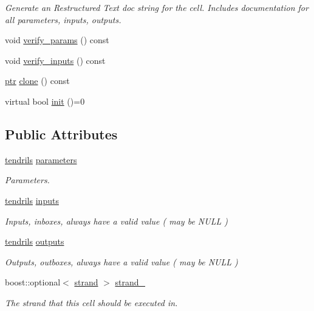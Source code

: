 \begin{DoxyCompactItemize}
\begin{DoxyCompactList}\small\item\em Generate an Restructured Text doc string for the cell. Includes documentation for all parameters, inputs, outputs. \end{DoxyCompactList}\item 
void \hyperlink{structecto_1_1cell_aa03c0f569bb4b14e81f4d2a8747273e5}{verify\-\_\-params} () const 
\item 
void \hyperlink{structecto_1_1cell_aed712e80344ce04dbb9105bb6a1aa53a}{verify\-\_\-inputs} () const 
\item 
\hyperlink{structecto_1_1cell_af2cab9d2bc012088c4f58c40da57a862}{ptr} \hyperlink{structecto_1_1cell_a213dabd285300f5d4c7e0f5fd6142e81}{clone} () const 
\item 
virtual bool \hyperlink{structecto_1_1cell_ab9a6c3fd8f76289f338a9e05368b1aff}{init} ()=0
\end{DoxyCompactItemize}
\subsection*{Public Attributes}
\begin{DoxyCompactItemize}
\item 
\hyperlink{classecto_1_1tendrils}{tendrils} \hyperlink{structecto_1_1cell_ae00a91199c758cf7c24dcf0ecdf70a27}{parameters}
\begin{DoxyCompactList}\small\item\em Parameters. \end{DoxyCompactList}\item 
\hyperlink{classecto_1_1tendrils}{tendrils} \hyperlink{structecto_1_1cell_a65099b0458a7761b8bfa7a1ddc17e92f}{inputs}
\begin{DoxyCompactList}\small\item\em Inputs, inboxes, always have a valid value ( may be N\-U\-L\-L ) \end{DoxyCompactList}\item 
\hyperlink{classecto_1_1tendrils}{tendrils} \hyperlink{structecto_1_1cell_a93951743b603faba35312ebdb07ceb22}{outputs}
\begin{DoxyCompactList}\small\item\em Outputs, outboxes, always have a valid value ( may be N\-U\-L\-L ) \end{DoxyCompactList}\item 
boost\-::optional$<$ \hyperlink{structecto_1_1strand}{strand} $>$ \hyperlink{structecto_1_1cell_a0ecc893a5427877548d0c39a208a5a26}{strand\-\_\-}
\begin{DoxyCompactList}\small\item\em The strand that this cell should be executed in. \end{DoxyCompactList}\end{DoxyCompactItemize}
